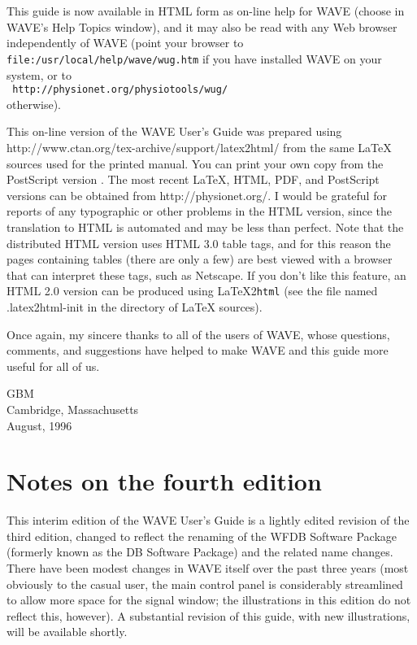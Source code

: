 \documentclass[twoside]{book}
\newcommand{\button}[1]{\cornersize{2}\ovalbox{\rule[-.3mm]{0cm}{2.5mm}\small\sf ~#1~}}
\newcommand{\WAVE}{{\sf WAVE}\xspace}
\begin{document}
\begin{latexonly}
This guide is now available in HTML form as on-line help for \WAVE{}
(choose \button{User's Guide} in \WAVE{}'s {\sf Help Topics} window),
and it may also be read with any Web browser independently of \WAVE{}
(point your browser to {\tt
file:\-/usr\-/local\-/help\-/wave\-/wug.htm} if you 
have installed \WAVE{} on your system, or to\\
{\tt
http://physionet.org\-/physiotools\-/wug/}\\
otherwise). 
\end{latexonly}
\begin{htmlonly}
This on-line version of the \WAVE{} User's Guide was prepared using
{http://www.ctan.org/tex-archive/support/latex2html/}
from the same \LaTeX{} sources used for the
printed manual.  You can print your own copy from the PostScript version
.  The most recent \LaTeX{}, HTML, PDF, and
PostScript versions can be obtained from
{http://physionet.org/}.
I would be grateful for reports of any typographic or other problems
in the HTML version, since the translation to HTML is automated and
may be less than perfect.  Note that the distributed HTML version uses
HTML 3.0 table tags, and for this reason the pages containing tables
(there are only a few) are best viewed with a browser that can
interpret these tags, such as Netscape.  If you don't like this
feature, an HTML 2.0 version can be produced using \LaTeX 2\texttt{html}
(see the file named {.latex2html-init} in the directory of \LaTeX{}
sources).
\end{htmlonly}

Once again, my sincere thanks to all of the users of \WAVE{}, whose questions,
comments, and suggestions have helped to make \WAVE{} and this guide
more useful for all of us.

\vspace{2em}
\noindent
GBM\\
Cambridge, Massachusetts\\
August, 1996

\section*{Notes on the fourth edition}

This interim edition of the \WAVE{} User's Guide is a lightly edited
revision of the third edition, changed to reflect the renaming of the
WFDB Software Package (formerly known as the DB Software Package) and
the related name changes.  There have been modest changes in \WAVE{}
itself over the past three years (most obviously to the casual user,
the main control panel is considerably streamlined to allow more space
for the signal window;  the illustrations in this edition do not
reflect this, however).  A substantial revision of this
guide, with new illustrations, will be available shortly.
\end{document}
